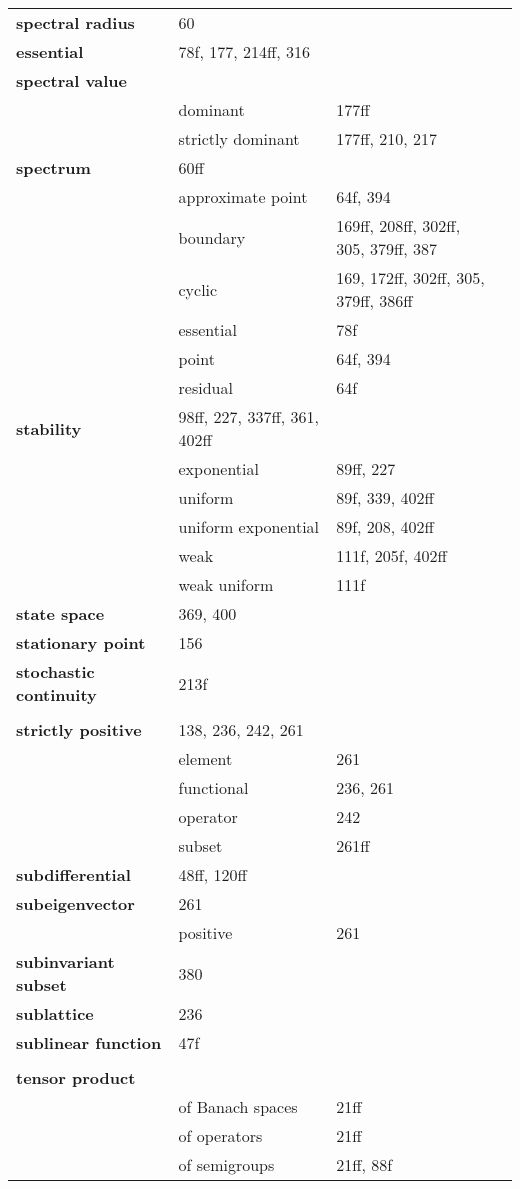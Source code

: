 \documentclass[10pt]{scrartcl}
\begin{document}
\begin{longtable}{>{\bfseries}p{4cm}p{4cm}p{4cm}p{4cm}}
spectral radius 	&  60 \\
essential 	&  78f, 177, 214ff, 316 \\
spectral value 	&  \\
	& dominant 	&  177ff \\
	& strictly dominant 	&  177ff, 210, 217 \\
spectrum 	&  60ff \\
	& approximate point 	&  64f, 394 \\
	& boundary 	&  169ff, 208ff, 302ff, 305, 379ff, 387 \\
	& cyclic 	&  169, 172ff, 302ff, 305, 379ff, 386ff \\
	& essential 	&  78f \\
	& point 	&  64f, 394 \\
	& residual 	&  64f \\
stability 	&  98ff, 227, 337ff, 361, 402ff \\
	& exponential 	&  89ff, 227 \\
	& uniform 	&  89f, 339, 402ff \\
	& uniform exponential 	&  89f, 208, 402ff \\
	& weak 	&  111f, 205f, 402ff \\
	& weak uniform 	&  111f \\
state space 	&  369, 400 \\
stationary point 	&  156 \\
stochastic continuity 	&  213f \\
\\
strictly positive 	&  138, 236, 242, 261 \\
	& element 	&  261 \\
	& functional 	&  236, 261 \\
	& operator 	&  242 \\
	& subset 	&  261ff \\
subdifferential 	&  48ff, 120ff \\
subeigenvector 	&  261 \\
	& positive 	&  261 \\
subinvariant subset 	&  380 \\
sublattice 	&  236 \\
sublinear function 	&  47f \\
\\
tensor product 	&  \\
	& of Banach spaces 	&  21ff \\
	& of operators 	&  21ff \\
	& of semigroups 	&  21ff, 88f \\

\end{longtable}
\end{document}
